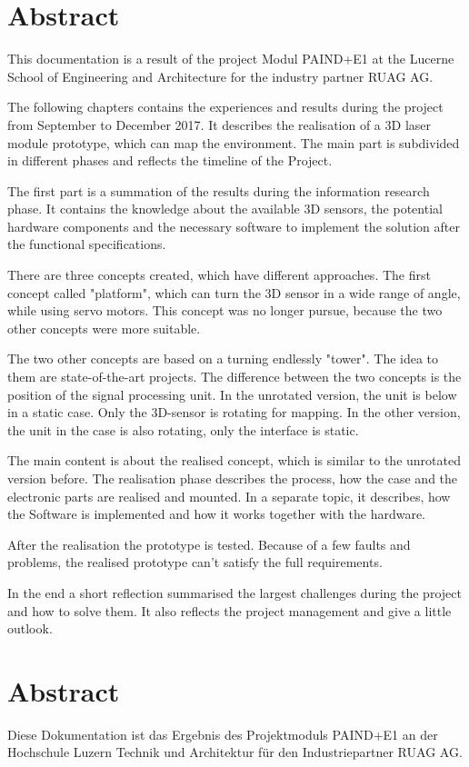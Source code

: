 \chapter*{Abstract}
\label{chap:Abstract}
This documentation is a result of the project Modul PAIND+E1 at the Lucerne School of Engineering and Architecture for the industry partner RUAG AG. 

The following chapters contains the experiences and results during the project from September to December 2017. It describes the realisation of a 3D laser module prototype, which can map the environment. The main part is subdivided in different phases and reflects the timeline of the Project. 

The first part is a summation of the results during the information research phase. It contains the knowledge about the available 3D sensors, the potential hardware components and the necessary software to implement the solution after the functional specifications. 

There are three concepts created, which have different approaches. The first concept called "platform", which can turn the 3D sensor in a wide range of angle, while using servo motors. This concept was no longer pursue, because the two other concepts were more suitable.

The two other concepts are based on a turning endlessly "tower". The idea to them are state-of-the-art projects. The difference between the two concepts is the position of the signal processing unit. In the unrotated version, the unit is below in a static case. Only the 3D-sensor is rotating for mapping. In the other version, the unit in the case is also rotating, only the interface is static. 

The main content is about the realised concept, which is similar to the unrotated version before. The realisation phase describes the process, how the case and the electronic parts are realised and mounted. In a separate topic, it describes, how the Software is implemented and how it works together with the hardware. 

After the realisation the prototype is tested. Because of a few faults and problems, the realised prototype can't satisfy the full requirements. 

In the end a short reflection summarised the largest challenges during the project and how to solve them. It also reflects the project management and give a little outlook.


\chapter*{Abstract}
Diese Dokumentation ist das Ergebnis des Projektmoduls PAIND+E1 an der Hochschule Luzern Technik und Architektur für den Industriepartner RUAG AG.


